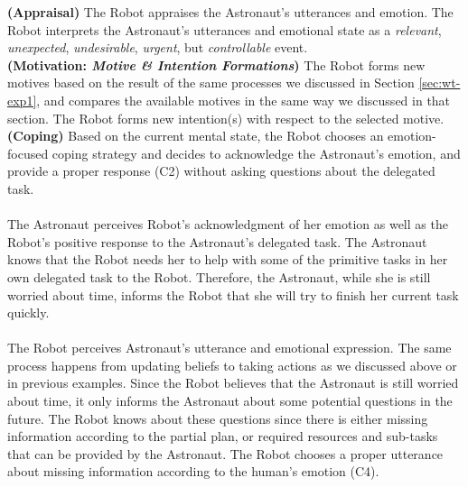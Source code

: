 \noindent\textbf{(Appraisal)} The Robot appraises the Astronaut's utterances and
emotion. The Robot interprets the Astronaut's utterances and emotional state as
a \textit{relevant}, \textit{unexpected}, \textit{undesirable}, \textit{urgent},
but \textit{controllable} event.\\

\noindent\textbf{(Motivation: \textit{Motive \& Intention Formations})} The
Robot forms new motives based on the result of the same processes we discussed
in Section \ref{sec:wt-exp1}, and compares the available motives in the same way
we discussed in that section. The Robot forms new intention(s) with respect to
the selected motive.\\

\noindent\textbf{(Coping)} Based on the current mental state, the Robot chooses
an emotion-focused coping strategy and decides to acknowledge the Astronaut's
emotion, and provide a proper response (C2) without asking questions about the
delegated task.\\

\noindent{}\\

The Astronaut perceives Robot's acknowledgment of her emotion as well as the
Robot's positive response to the Astronaut's delegated task. The Astronaut knows
that the Robot needs her to help with some of the primitive tasks in her own
delegated task to the Robot. Therefore, the Astronaut, while she is still
worried about time, informs the Robot that she will try to finish her current
task quickly.\\

\noindent{}\\

The Robot perceives Astronaut's utterance and emotional expression. The same
process happens from updating beliefs to taking actions as we discussed above or
in previous examples. Since the Robot believes that the Astronaut is still
worried about time, it only informs the Astronaut about some potential questions
in the future. The Robot knows about these questions since there is either
missing information according to the partial plan, or required resources and
sub-tasks that can be provided by the Astronaut. The Robot chooses a proper
utterance about missing information according to the human's emotion (C4).\\

